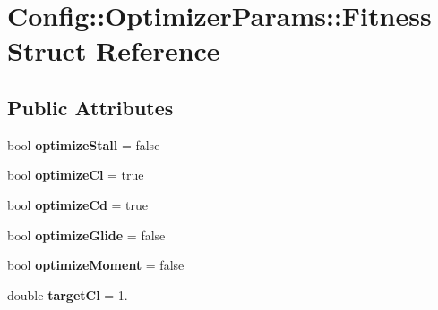 \hypertarget{struct_config_1_1_optimizer_params_1_1_fitness}{}\section{Config\+:\+:Optimizer\+Params\+:\+:Fitness Struct Reference}
\label{struct_config_1_1_optimizer_params_1_1_fitness}
\subsection*{Public Attributes}
\begin{DoxyCompactItemize}
\item 
\mbox{\label{struct_config_1_1_optimizer_params_1_1_fitness_a200cf3c64e202394decaec34d89bd280}} 
bool {\bfseries optimize\+Stall} = false
\item 
\mbox{\label{struct_config_1_1_optimizer_params_1_1_fitness_afbb10a58397284eeabc89a951ee3d467}} 
bool {\bfseries optimize\+Cl} = true
\item 
\mbox{\label{struct_config_1_1_optimizer_params_1_1_fitness_a8175a4e1d6d67dee007591263c78053b}} 
bool {\bfseries optimize\+Cd} = true
\item 
\mbox{\label{struct_config_1_1_optimizer_params_1_1_fitness_a9cade69b8a94f7400d0136d85f84832e}} 
bool {\bfseries optimize\+Glide} = false
\item 
\mbox{\label{struct_config_1_1_optimizer_params_1_1_fitness_ac5978cb103bc4761ddb8411edf237ba7}} 
bool {\bfseries optimize\+Moment} = false
\item 
\mbox{\label{struct_config_1_1_optimizer_params_1_1_fitness_a01359bf3a0aff54006267de6e52301b8}} 
double {\bfseries target\+Cl} = 1.
\item 
\mbox{\label{struct_config_1_1_optimizer_params_1_1_fitness_ab41096bb4d5ea5bf319e7d9db250d081}} 

\end{DoxyCompactItemize}
